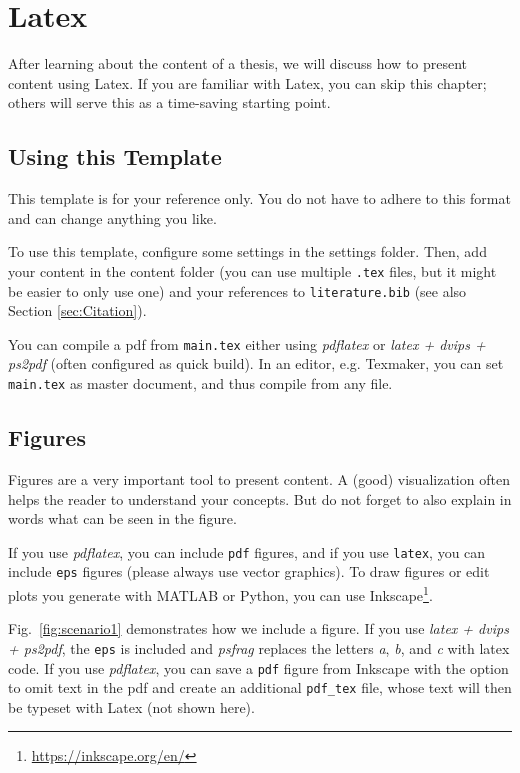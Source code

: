 \chapter{Latex} \label{ch:latex}
After learning about the content of a thesis, we will discuss how to present content using Latex. If you are familiar with Latex, you can skip this chapter; others will serve this as a time-saving starting point.


\section{Using this Template} \label{sec:Using_this_template}
This template is for your reference only. You do not have to adhere to this format and can change anything you like.

To use this template, configure some settings in the settings folder. Then, add your content in the content folder (you can use multiple \texttt{.tex} files, but it might be easier to only use one) and your references to \texttt{literature.bib} (see also Section \ref{sec:Citation}).

You can compile a pdf from \texttt{main.tex} either using \emph{pdflatex} or  \emph{latex + dvips + ps2pdf} (often configured as quick build). In an editor, e.g. Texmaker, you can set \texttt{main.tex} as master document, and thus compile from any file.


\section{Figures} \label{sec:Figures}
Figures are a very important tool to present content. A (good) visualization often helps the reader to understand your concepts. But do not forget to also explain in words what can be seen in the figure.

If you use \emph{pdflatex}, you can include \texttt{pdf} figures, and if you use \texttt{latex}, you can include \texttt{eps} figures (please always use vector graphics). To draw figures or edit plots you generate with MATLAB or Python, you can use Inkscape\footnote{\url{https://inkscape.org/en/}}.

Fig.~\ref{fig:scenario1} demonstrates how we include a figure. If you use \emph{latex + dvips + ps2pdf}, the \texttt{eps} is included and \emph{psfrag} replaces the letters \emph{a}, \emph{b}, and \emph{c} with latex code. If you use \emph{pdflatex}, you can save a \texttt{pdf} figure from Inkscape with the option to omit text in the pdf and create an additional \texttt{pdf\_tex} file, whose text will then be typeset with Latex (not shown here).

